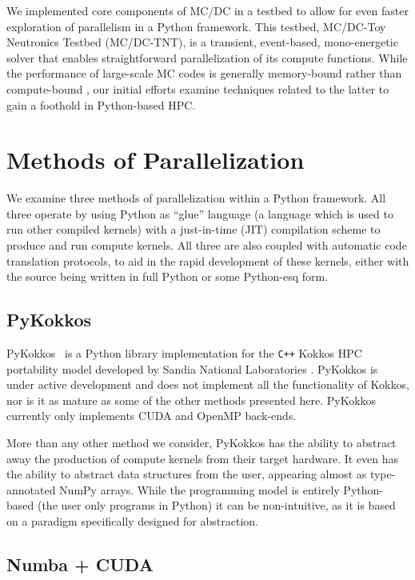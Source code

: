 We implemented core components of MC/DC in a testbed to allow for even faster exploration of parallelism in a Python framework.
This testbed, MC/DC-Toy Neutronics Testbed (MC/DC-TNT), is a transient, event-based, mono-energetic solver that enables straightforward parallelization of its compute functions.
While the performance of large-scale MC codes is generally memory-bound rather than compute-bound \cite{Tramm2015MemoryCodes}, our initial efforts examine techniques related to the latter to gain a foothold in Python-based HPC.

\section{Methods of Parallelization}

We examine three methods of parallelization within a Python framework.
All three operate by using Python as ``glue'' language (a language which is used to run other compiled kernels) with a just-in-time (JIT) compilation scheme to produce and run compute kernels. 
All three are also coupled with automatic code translation protocols, to aid in the rapid development of these kernels, either with the source being written in full Python or some Python-esq form.

\subsection{PyKokkos}

PyKokkos~\cite{AlAwarETAL21PyKokkos} is a Python library implementation for the \texttt{C++} Kokkos HPC portability model developed by Sandia National Laboratories \cite{CarterEdwards2014Kokkos:Patterns}.
PyKokkos is under active development and does not implement all the functionality of Kokkos, nor is it as mature as some of the other methods presented here.
PyKokkos currently only implements CUDA and OpenMP back-ends.

More than any other method we consider, PyKokkos has the ability to abstract away the production of compute kernels from their target hardware.
It even has the ability to abstract data structures from the user, appearing almost as type-annotated NumPy \cite{harris2020array} arrays.
While the programming model is entirely Python-based (the user only programs in Python) it can be non-intuitive, as it is based on a paradigm specifically designed for abstraction.

\subsection{Numba + CUDA}

